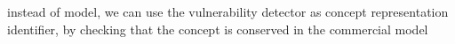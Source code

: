 instead of model, we can use the vulnerability detector as concept representation identifier, by checking that the concept is conserved in the commercial model